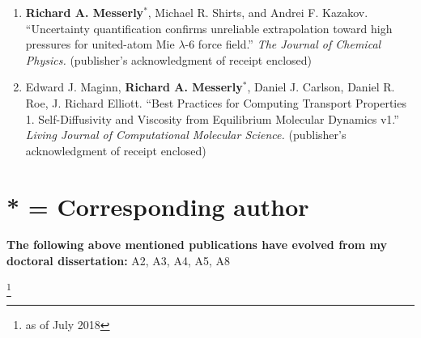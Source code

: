 \documentclass[12pt]{article}
\newcommand\blfootnote[1]{%
	\begingroup
	\renewcommand\thefootnote{}\footnote{#1}%
	\addtocounter{footnote}{-1}%
	\endgroup
}
\begin{document}
\begin{enumerate}
	
%	

\item \textbf{Richard A. Messerly}$^*$, Michael R. Shirts, and Andrei F. Kazakov. ``Uncertainty quantification confirms unreliable extrapolation toward high pressures for united-atom Mie $\lambda$-6 force field.'' \textit{The Journal of Chemical Physics.} (publisher's acknowledgment of receipt enclosed)

\item Edward J. Maginn, \textbf{Richard A. Messerly}$^*$, Daniel J. Carlson, Daniel R. Roe, J. Richard Elliott. ``Best Practices for Computing Transport Properties 1. Self-Diffusivity and Viscosity from Equilibrium Molecular Dynamics v1.'' \textit{Living Journal of Computational Molecular Science.} (publisher's acknowledgment of receipt enclosed)

\end{enumerate}

\section*{* = Corresponding author}

\textbf{The following above mentioned publications have evolved from my doctoral dissertation:} A2, A3, A4, A5, A8

\blfootnote{as of July 2018}
\end{document}
